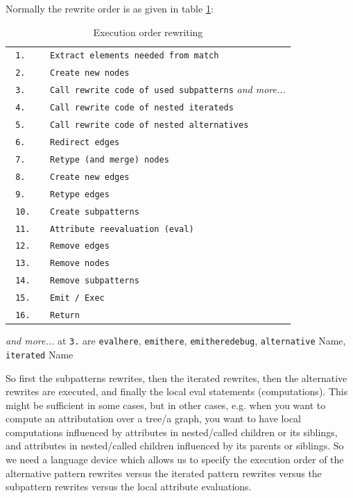 Normally the rewrite order is as given in table \ref{table:executionorderrewriting}:
\begin{table}[htbp]
  \centering
  \begin{tabularx}{\linewidth}{|l|X|} \hline
    \texttt{ 1. } & \texttt{ Extract elements needed from match } \\
    \texttt{ 2. } & \texttt{ Create new nodes } \\
    \texttt{ 3. } & \texttt{ Call rewrite code of used subpatterns} \emph{and more...} \\ 
	  \texttt{ 4. } & \texttt{ Call rewrite code of nested iterateds } \\
    \texttt{ 5. } & \texttt{ Call rewrite code of nested alternatives } \\
    \texttt{ 6. } & \texttt{ Redirect edges } \\  
    \texttt{ 7. } & \texttt{ Retype (and merge) nodes } \\  
    \texttt{ 8. } & \texttt{ Create new edges } \\
    \texttt{ 9. } & \texttt{ Retype edges } \\  
    \texttt{ 10. } & \texttt{ Create subpatterns } \\
    \texttt{ 11. } & \texttt{ Attribute reevaluation (eval) } \\
    \texttt{ 12. } & \texttt{ Remove edges } \\ 
	  \texttt{ 13. } & \texttt{ Remove nodes } \\
    \texttt{ 14. } & \texttt{ Remove subpatterns } \\
    \texttt{ 15. } & \texttt{ Emit / Exec } \\  
    \texttt{ 16. } & \texttt{ Return } \\ \hline
	\end{tabularx}
	{\small \emph{and more...} at \texttt{3.} are \texttt{evalhere}, \texttt{emithere}, \texttt{emitheredebug}, \texttt{alternative} Name, \texttt{iterated} Name}
  \caption{Execution order rewriting}
  \label{table:executionorderrewriting}
\end{table}

So first the subpatterns rewrites, then the iterated rewrites, then the alternative rewrites are executed, and finally the local eval statements (computations).
This might be sufficient in some cases, but in other cases, e.g. when you want to compute an attributation over a tree/a graph, you want to have local computations influenced by attributes in nested/called children or its siblings, and attributes in nested/called children influenced by its parents or siblings.
So we need a language device which allows us to specify the execution order of the alternative pattern rewrites versus the iterated pattern rewrites versus the subpattern rewrites versus the local attribute evaluations.

